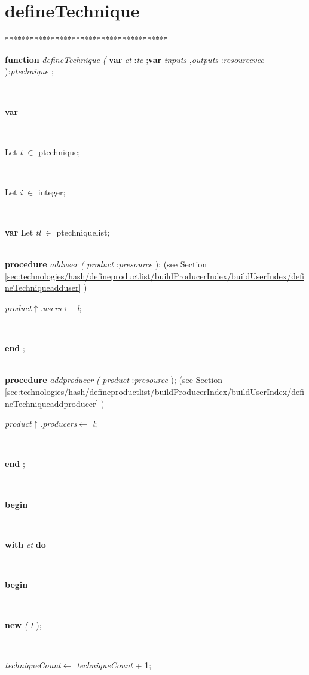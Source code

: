 \section{defineTechnique}\label{sec:technologies/hash/defineproductlist/buildProducerIndex/buildUserIndexdefineTechnique}

\begin{tabbing}
***\=***\=***\=***\=***\=***\=***\=***\=***\=***\=***\=***\=***\=\kill
\parbox{14cm}{\textsf{\textbf{function}   \textit{defineTechnique} \textit{(} \textbf{var}  \textit{ct} :\textit{tc} ;\textbf{var}  \textit{inputs} ,\textit{outputs} :\textit{resourcevec}  ):\textit{ptechnique} ;}}\\
\+\parbox{14cm}{\textsf{\textbf{var} }}\\
\parbox{14cm}{\textsf{Let \textit{t} $\in$ ptechnique;}}\\
\parbox{14cm}{\textsf{Let \textit{i} $\in$ integer;}}\\
\<\parbox{14cm}{\textsf {\textbf {var } \textsf{Let \textit{tl} $\in$ ptechniquelist;}}}\\
\<\textsf{\textbf{procedure}  \textit{adduser} \textit{(} \textit{product} :\textit{presource}  );} (see Section \ref{sec:technologies/hash/defineproductlist/buildProducerIndex/buildUserIndex/defineTechniqueadduser} )\\
\parbox{14cm}{\textsf{\textit{product}$\uparrow$.\textit{users}$\leftarrow$ \textit{l}}; }\\
\<\-\parbox{14cm}{\textsf{\textbf{end} ;}}\\
\textsf{\textbf{procedure}  \textit{addproducer} \textit{(} \textit{product} :\textit{presource}  );} (see Section \ref{sec:technologies/hash/defineproductlist/buildProducerIndex/buildUserIndex/defineTechniqueaddproducer} )\\
\parbox{14cm}{\textsf{\textit{product}$\uparrow$.\textit{producers}$\leftarrow$ \textit{l}}; }\\
\parbox{14cm}{\textsf{\textbf{end} ;}}\\
\parbox{14cm}{\textsf{\textbf{begin} }}\\
\+\parbox{14cm}{\textsf {\textbf {with } \textsf{\textit{ct}} \textbf{ do } }}\\
\<\parbox{14cm}{\textsf{\textbf{begin} }}\\
\parbox{14cm}{\textsf{\textbf{new} \textit{(} \textit{t} );}}\\
\parbox{14cm}{\textsf{\textit{techniqueCount}$\leftarrow$ \textit{techniqueCount} + 1}; }\\

\end{tabbing}
